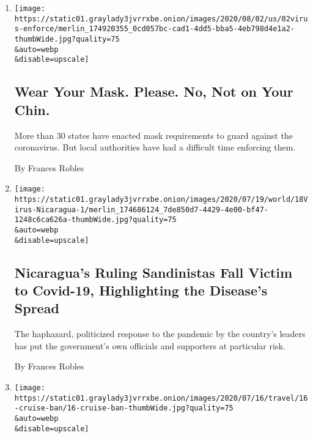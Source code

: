 \begin{enumerate}
\def\labelenumi{\arabic{enumi}.}
\item
  \href{/2020/07/31/us/coronavirus-masks-enforcement-key-west.html}{}

  \texttt{[image: https://static01.graylady3jvrrxbe.onion/images/2020/08/02/us/02virus-enforce/merlin\_174920355\_0cd057bc-cad1-4dd5-bba5-4eb798d4e1a2-thumbWide.jpg?quality=75\\\&auto=webp\\\&disable=upscale]}

  \hypertarget{wear-your-mask-please-no-not-on-your-chin}{%
  \subsection{Wear Your Mask. Please. No, Not on Your
  Chin.}\label{wear-your-mask-please-no-not-on-your-chin}}

  More than 30 states have enacted mask requirements to guard against
  the coronavirus. But local authorities have had a difficult time
  enforcing them.

  By Frances Robles
\item
  \href{/2020/07/18/world/americas/coronavirus-nicaragua-sandinistas.html}{}

  \texttt{[image: https://static01.graylady3jvrrxbe.onion/images/2020/07/19/world/18Virus-Nicaragua-1/merlin\_174686124\_7de850d7-4429-4e00-bf47-1248c6ca626a-thumbWide.jpg?quality=75\\\&auto=webp\\\&disable=upscale]}

  \hypertarget{nicaraguas-ruling-sandinistas-fall-victim-to-covid-19-highlighting-the-diseases-spread}{%
  \subsection{Nicaragua's Ruling Sandinistas Fall Victim to Covid-19,
  Highlighting the Disease's
  Spread}\label{nicaraguas-ruling-sandinistas-fall-victim-to-covid-19-highlighting-the-diseases-spread}}

  The haphazard, politicized response to the pandemic by the country's
  leaders has put the government's own officials and supporters at
  particular risk.

  By Frances Robles
\item
  \href{/2020/07/16/travel/coronavirus-cruise-ban-extended.html}{}

  \texttt{[image: https://static01.graylady3jvrrxbe.onion/images/2020/07/16/travel/16-cruise-ban/16-cruise-ban-thumbWide.jpg?quality=75\\\&auto=webp\\\&disable=upscale]}

  \hypertarget{extending-cruise-ban-cdc-slams-industry-for-spreading-coronavirus}{%
}
\end{enumerate}
